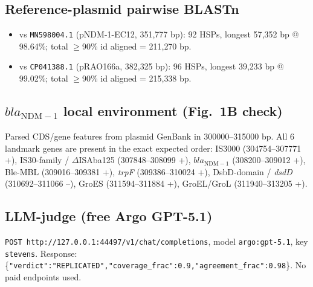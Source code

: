 \documentclass[11pt,letterpaper]{article}
\begin{document}
\subsection{Reference-plasmid pairwise BLASTn}
\begin{itemize}[leftmargin=1.5em, itemsep=1pt]
  \item vs \texttt{MN598004.1} (pNDM-1-EC12, 351{,}777 bp): 92 HSPs, longest 57{,}352 bp @ 98.64\%; total $\geq$90\% id aligned = 211{,}270 bp.
  \item vs \texttt{CP041388.1} (pRAO166a, 382{,}325 bp): 96 HSPs, longest 39{,}233 bp @ 99.02\%; total $\geq$90\% id aligned = 215{,}338 bp.
\end{itemize}

\subsection{$bla_{\mathrm{NDM-1}}$ local environment (Fig.~1B check)}
Parsed CDS/gene features from plasmid GenBank in 300000--315000 bp. All 6 landmark genes are present
in the exact expected order: IS3000 (304754--307771 +), IS30-family / $\Delta$ISAba125 (307848--308099 +),
$bla_{\mathrm{NDM-1}}$ (308200--309012 +), Ble-MBL (309016--309381 +), \textit{trpF} (309386--310024 +),
DsbD-domain / \textit{dsdD} (310692--311066 --), GroES (311594--311884 +), GroEL/GroL (311940--313205 +).

\subsection{LLM-judge (free Argo GPT-5.1)}
\texttt{POST http://127.0.0.1:44497/v1/chat/completions}, model \texttt{argo:gpt-5.1}, key \texttt{stevens}.
Response: \{\texttt{"verdict":"REPLICATED","coverage\_frac":0.9,"agreement\_frac":0.98}\}. No paid endpoints used.
\end{document}
